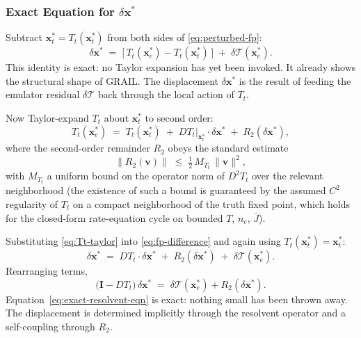 \documentclass[11pt]{article}
\newcommand{\Tcyc}{\mathcal{T}}
\newcommand{\dT}{\delta\Tcyc}
\newcommand{\Jbar}{\bar{J}}
\begin{document}
\subsubsection{Exact Equation for $\delta\mathbf{x}^{*}$}

Subtract $\mathbf{x}_t^* = T_t(\mathbf{x}_t^*)$ from both sides of
\eqref{eq:perturbed-fp}:
\begin{equation}
\delta\mathbf{x}^{*}
\;=\; \bigl[\,T_t(\mathbf{x}_e^*) - T_t(\mathbf{x}_t^*)\,\bigr]
\;+\; \dT(\mathbf{x}_e^*) .
\label{eq:fp-difference}
\end{equation}
This identity is exact: no Taylor expansion has yet been invoked.  It
already shows the structural shape of GRAIL.  The displacement
$\delta\mathbf{x}^{*}$ is the result of feeding the emulator residual
$\dT$ back through the local action of $T_t$.

Now Taylor-expand $T_t$ about $\mathbf{x}_t^*$ to second order:
\begin{equation}
T_t(\mathbf{x}_e^*) \;=\; T_t(\mathbf{x}_t^*)
\;+\; DT_t\big|_{\mathbf{x}_t^*}\!\cdot \delta\mathbf{x}^{*}
\;+\; R_2(\delta\mathbf{x}^{*}) ,
\label{eq:Tt-taylor}
\end{equation}
where the second-order remainder $R_2$ obeys the standard estimate
\begin{equation}
\|R_2(\mathbf{v})\| \;\leq\; \tfrac{1}{2}\, M_{T_t}\, \|\mathbf{v}\|^2,
\label{eq:R2-bound}
\end{equation}
with $M_{T_t}$ a uniform bound on the operator norm of $D^2 T_t$ over
the relevant neighborhood (the existence of such a bound is guaranteed
by the assumed $C^2$ regularity of $T_t$ on a compact neighborhood of
the truth fixed point, which holds for the closed-form rate-equation
cycle on bounded $T$, $n_e$, $\Jbar$).

Substituting \eqref{eq:Tt-taylor} into \eqref{eq:fp-difference} and
again using $T_t(\mathbf{x}_t^*) = \mathbf{x}_t^*$:
\begin{equation}
\delta\mathbf{x}^{*}
\;=\; DT_t\!\cdot \delta\mathbf{x}^{*}
\;+\; R_2(\delta\mathbf{x}^{*})
\;+\; \dT(\mathbf{x}_e^*).
\end{equation}
Rearranging terms,
\begin{equation}
\boxed{\;\bigl(\mathbf{I} - DT_t\bigr)\, \delta\mathbf{x}^{*}
\;=\; \dT(\mathbf{x}_e^*) + R_2(\delta\mathbf{x}^{*}) .\;}
\label{eq:exact-resolvent-eqn}
\end{equation}
Equation~\eqref{eq:exact-resolvent-eqn} is exact: nothing small has
been thrown away.  The displacement is determined implicitly through
the resolvent operator and a self-coupling through $R_2$.
\end{document}
